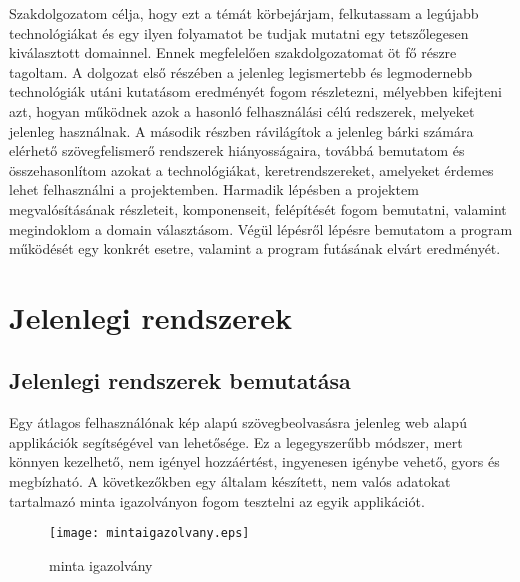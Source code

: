 \documentclass[12pt]{report}
\begin{document}
Szakdolgozatom célja, hogy ezt a témát körbejárjam, felkutassam a legújabb technológiákat és egy ilyen folyamatot be tudjak mutatni egy tetszőlegesen kiválasztott domainnel.
\newline
Ennek megfelelően szakdolgozatomat öt fő részre tagoltam. A dolgozat első részében a jelenleg legismertebb és legmodernebb technológiák utáni kutatásom eredményét fogom részletezni, mélyebben kifejteni azt, hogyan működnek azok a hasonló felhasználási célú redszerek, melyeket jelenleg használnak. A második részben rávilágítok a jelenleg bárki számára elérhető szövegfelismerő rendszerek hiányosságaira, továbbá bemutatom és összehasonlítom azokat a technológiákat, keretrendszereket, amelyeket érdemes lehet felhasználni a projektemben. Harmadik lépésben a projektem megvalósításának részleteit, komponenseit, felépítését fogom bemutatni, valamint megindoklom a domain választásom. Végül lépésről lépésre bemutatom a program működését egy konkrét esetre, valamint a program futásának elvárt eredményét.



\chapter{Jelenlegi rendszerek}
\section{Jelenlegi rendszerek bemutatása}


Egy átlagos felhasználónak kép alapú szövegbeolvasásra jelenleg web alapú applikációk segítségével van lehetősége. Ez a legegyszerűbb módszer, mert könnyen kezelhető, nem igényel hozzáértést, ingyenesen igénybe vehető, gyors és megbízható. A következőkben egy általam készített, nem valós adatokat tartalmazó minta igazolványon fogom tesztelni az egyik applikációt.

\newline

\begin{figure}[h]
  \centerline{\texttt{[image: mintaigazolvany.eps]}}
  \caption{minta igazolvány}
\end{figure}

\pagebreak
\end{document}
